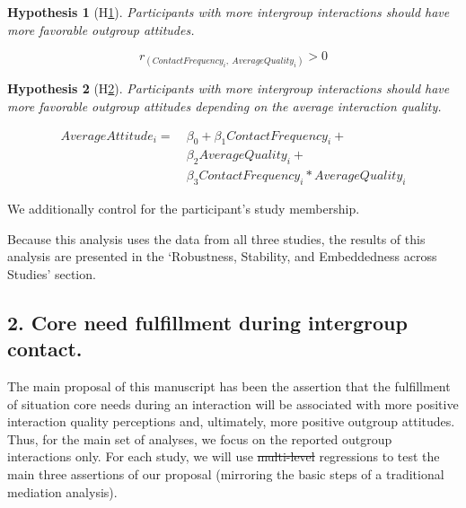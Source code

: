 \documentclass[man, 12pt, a4paper, mask]{apa7}
\theoremstyle{break}
\theoremstyle{plain}
\newtheorem{subhyp}{Hypothesis}
\providecommand{\DIFaddtex}[1]{{\protect\color{blue}\uwave{#1}}} %
\providecommand{\DIFdeltex}[1]{{\protect\color{red}\sout{#1}}}                      %
\providecommand{\DIFaddbegin}{} %
\providecommand{\DIFaddend}{} %
\providecommand{\DIFdelbegin}{} %
\providecommand{\DIFdelend}{} %
\providecommand{\DIFadd}[1]{\texorpdfstring{\DIFaddtex{#1}}{#1}} %
\providecommand{\DIFdel}[1]{\texorpdfstring{\DIFdeltex{#1}}{}} %
\newcommand{\DIFscaledelfig}{0.5}
\newlength{\DIFdelgraphicswidth} %
\newlength{\DIFdelgraphicsheight} %
\newcommand{\DIFaddincludegraphics}[2][]{{\color{blue}\fbox{\DIFOincludegraphics[#1]{#2}}}} %
\newcommand{\DIFdelincludegraphics}[2][]{%
\sbox{\DIFdelgraphicsbox}{\DIFOincludegraphics[#1]{#2}}%
\settoboxwidth{\DIFdelgraphicswidth}{\DIFdelgraphicsbox} %
\settoboxtotalheight{\DIFdelgraphicsheight}{\DIFdelgraphicsbox} %
\scalebox{\DIFscaledelfig}{%
\parbox[b]{\DIFdelgraphicswidth}{\usebox{\DIFdelgraphicsbox}\\[-\baselineskip] \rule{\DIFdelgraphicswidth}{0em}}\llap{\resizebox{\DIFdelgraphicswidth}{\DIFdelgraphicsheight}{%
\setlength{\unitlength}{\DIFdelgraphicswidth}%
\begin{picture}(1,1)%
\thicklines\linethickness{2pt} %
{\color[rgb]{1,0,0}\put(0,0){\framebox(1,1){}}}%
{\color[rgb]{1,0,0}\put(0,0){\line( 1,1){1}}}%
{\color[rgb]{1,0,0}\put(0,1){\line(1,-1){1}}}%
\end{picture}%
}\hspace*{3pt}}} %
} %
\DeclareRobustCommand{\DIFaddbegin}{\DIFOaddbegin \let\includegraphics\DIFaddincludegraphics} %
\DeclareRobustCommand{\DIFaddend}{\DIFOaddend \let\includegraphics\DIFOincludegraphics} %
\DeclareRobustCommand{\DIFdelbegin}{\DIFOdelbegin \let\includegraphics\DIFdelincludegraphics} %
\DeclareRobustCommand{\DIFdelend}{\DIFOaddend \let\includegraphics\DIFOincludegraphics} %
\begin{document}
\begin{mdframed}[style=mdfhypothesis]
    \begin{subhyp}[H\ref{hyp:contactCor}] \label{hyp:contactCor}
    \addtolength{\leftskip}{\subhypskip}
    Participants with more intergroup interactions should have more favorable outgroup attitudes.
    \end{subhyp}

      \begin{fleqn}[\eqskip] 
        \begin{equation} \label{eq:ContactCor}
            r_{\left(ContactFrequency_{i},\ AverageQuality_{i}\right)} > 0
        \end{equation}
      \end{fleqn}

    \begin{subhyp}[H\ref{hyp:contactQualLM}] \label{hyp:contactQualLM}
    \addtolength{\leftskip}{\subhypskip}
    Participants with more intergroup interactions should have more favorable outgroup attitudes depending on the average interaction quality.
    \end{subhyp}

      \begin{fleqn}[\eqskip] 
        \begin{equation} \label{eq:contactQualLM}
            \begin{split}
              AverageAttitude_{i} = &\ \beta_{0} + \beta_{1}ContactFrequency_{i} + \\
                                    &\ \beta_{2}AverageQuality_{i} +\\
                                    &\ \beta_{3}ContactFrequency_{i} * AverageQuality_{i}
            \end{split}
        \end{equation}
      \end{fleqn}  

      We additionally control for the participant's study membership.
\end{mdframed}
Because this analysis uses the data from all three studies, the results of this analysis are presented in the `Robustness, Stability, and Embeddedness across Studies' section.

\subsection{2. Core need fulfillment during intergroup contact.}
The main proposal of this manuscript has been the assertion that the fulfillment of situation core needs during an interaction will be associated with more positive interaction quality perceptions and, ultimately, more positive outgroup attitudes. Thus, for the main set of analyses, we focus on the reported outgroup interactions only. For each study, we will use \DIFdelbegin \DIFdel{multi-level }\DIFdelend \DIFaddbegin \DIFadd{multilevel }\DIFaddend regressions to test the main three assertions of our proposal (mirroring the basic steps of a traditional mediation analysis).
\end{document}
